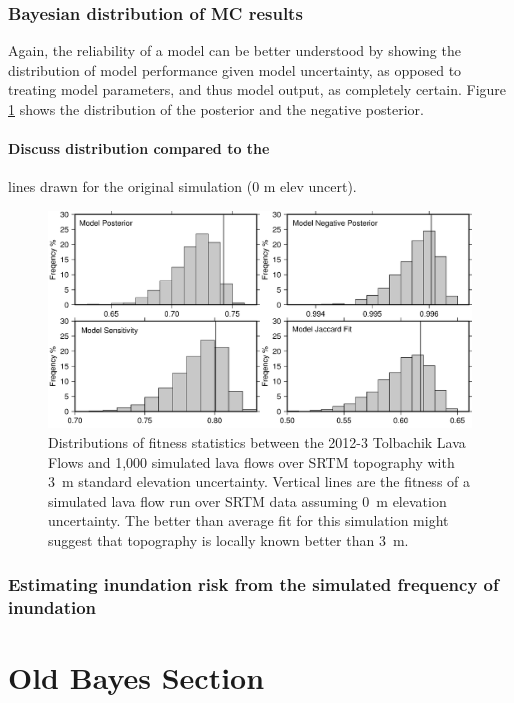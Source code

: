 \documentclass[12pt,letter]{article}
\begin{document}
		\subsubsection{Bayesian distribution of MC results}
				Again, the reliability of a model can be better understood by showing the distribution of model performance given model uncertainty, as opposed to treating model parameters, and thus model output, as completely certain. Figure \ref{fig:MC_dist} shows the distribution of the posterior and the negative posterior.  
		
		\paragraph{Discuss distribution compared to the} lines drawn for the original simulation (0 m elev uncert).


		\begin{figure}
			\centering
			\includegraphics[width=0.7\linewidth]{figures/bayes_graphs}
			\caption{Distributions of fitness statistics between the 2012-3 Tolbachik Lava Flows and 1,000 simulated lava flows over SRTM topography with 3~m standard elevation uncertainty. Vertical lines are the fitness of a simulated lava flow run over SRTM data assuming 0~m elevation uncertainty. The better than average fit for this simulation might suggest that topography is locally known better than 3~m.}
			\label{fig:MC_dist}
		\end{figure}

		\subsubsection{Estimating inundation risk from the simulated frequency of inundation}
		
\section{Old Bayes Section}
\end{document}

